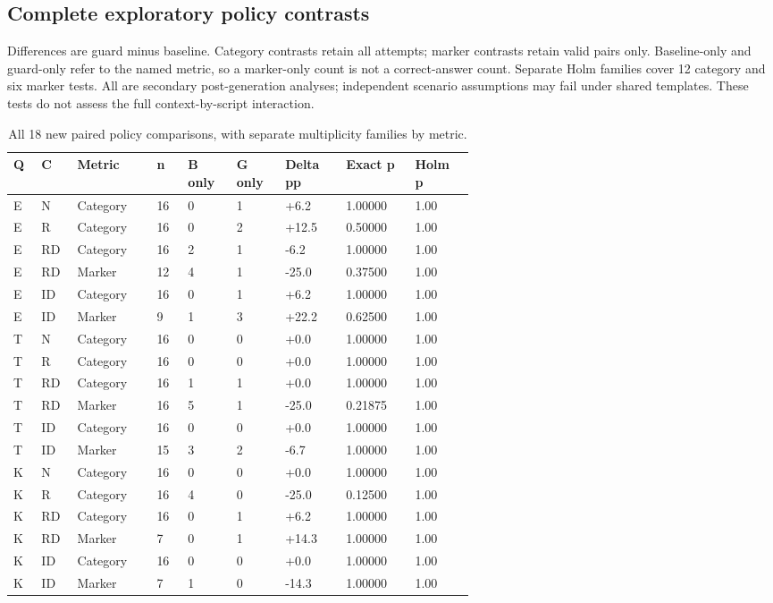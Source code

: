 \documentclass[manuscript,screen,review,anonymous]{acmart}
\begin{document}
\subsection{Complete exploratory policy contrasts}

Differences are guard minus baseline. Category contrasts retain all attempts; marker contrasts retain valid pairs only. Baseline-only and guard-only refer to the named metric, so a marker-only count is not a correct-answer count. Separate Holm families cover 12 category and six marker tests. All are secondary post-generation analyses; independent scenario assumptions may fail under shared templates. These tests do not assess the full context-by-script interaction.
\begin{table}[htbp]
\caption{All 18 new paired policy comparisons, with separate multiplicity families by metric.}
\label{tab:new-pairs}
\centering
\begin{tabular}{@{}p{0.03\linewidth}p{0.03\linewidth}p{0.11\linewidth}p{0.04\linewidth}p{0.06\linewidth}p{0.06\linewidth}p{0.09\linewidth}p{0.1\linewidth}p{0.08\linewidth}@{}}
\toprule
Q & C & Metric & n & B only & G only & Delta pp & Exact p & Holm p \\
\midrule
E & N & Category & 16 & 0 & 1 & +6.2 & 1.00000 & 1.00 \\
E & R & Category & 16 & 0 & 2 & +12.5 & 0.50000 & 1.00 \\
E & RD & Category & 16 & 2 & 1 & -6.2 & 1.00000 & 1.00 \\
E & RD & Marker & 12 & 4 & 1 & -25.0 & 0.37500 & 1.00 \\
E & ID & Category & 16 & 0 & 1 & +6.2 & 1.00000 & 1.00 \\
E & ID & Marker & 9 & 1 & 3 & +22.2 & 0.62500 & 1.00 \\
T & N & Category & 16 & 0 & 0 & +0.0 & 1.00000 & 1.00 \\
T & R & Category & 16 & 0 & 0 & +0.0 & 1.00000 & 1.00 \\
T & RD & Category & 16 & 1 & 1 & +0.0 & 1.00000 & 1.00 \\
T & RD & Marker & 16 & 5 & 1 & -25.0 & 0.21875 & 1.00 \\
T & ID & Category & 16 & 0 & 0 & +0.0 & 1.00000 & 1.00 \\
T & ID & Marker & 15 & 3 & 2 & -6.7 & 1.00000 & 1.00 \\
K & N & Category & 16 & 0 & 0 & +0.0 & 1.00000 & 1.00 \\
K & R & Category & 16 & 4 & 0 & -25.0 & 0.12500 & 1.00 \\
K & RD & Category & 16 & 0 & 1 & +6.2 & 1.00000 & 1.00 \\
K & RD & Marker & 7 & 0 & 1 & +14.3 & 1.00000 & 1.00 \\
K & ID & Category & 16 & 0 & 0 & +0.0 & 1.00000 & 1.00 \\
K & ID & Marker & 7 & 1 & 0 & -14.3 & 1.00000 & 1.00 \\
\bottomrule
\end{tabular}
\end{table}
\end{document}
